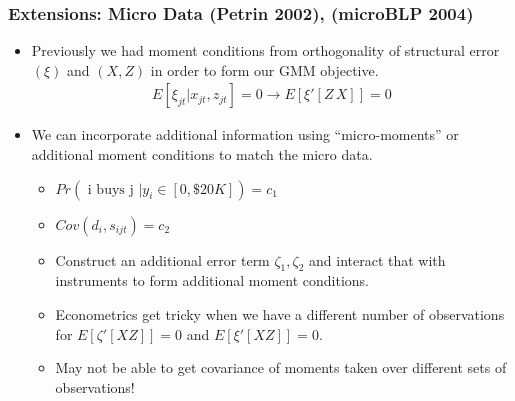 \documentclass[aspectratio=169,11pt]{beamer}
\begin{document}
\begin{frame} \frametitle{Extensions: Micro Data (Petrin 2002), (microBLP 2004)}
\begin{itemize}
\item Previously we had moment conditions from orthogonality of structural error $(\xi)$ and $(X,Z)$ in order to form our GMM objective.
\begin{eqnarray*}
E[\xi_{jt} | x_{jt}, z_{jt}]=0 \rightarrow E[\xi'  [Z \, X]]=0
\end{eqnarray*}
\item We can incorporate additional information using ``micro-moments'' or additional moment conditions to match the micro data.
\begin{itemize}
\item $Pr(\mbox{ i buys j } | y_i \in [0,\$20K])= c_1$
\item $Cov(d_i, s_{ijt}) = c_2$
\item Construct an additional error term $\zeta_1,\zeta_2$ and interact that with instruments to form additional moment conditions.
\item Econometrics get tricky when we have a different number of observations for $E[\zeta' [X Z]]=0$ and $E[\xi' [X Z]]=0$.
\item May not be able to get covariance of moments taken over different sets of observations!
\end{itemize}
\end{itemize}
\end{frame}
\end{document}
